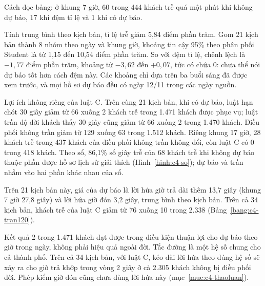 Cách đọc bảng: ở khung 7 giờ, 60 trong 444 khách trễ quá một phút khi không dự báo, 17 khi đệm tỉ lệ và 1 khi có dự
báo.

Tính trung bình theo kịch bản, tỉ lệ trễ giảm 5,84 điểm phần trăm. Gom 21 kịch bản thành 8 nhóm theo ngày và khung giờ,
khoảng tin cậy 95\% theo phân phối Student là từ 1,15 đến 10,54 điểm phần trăm. So với đệm tỉ lệ, chênh lệch là
$-1{,}77$ điểm phần trăm, khoảng từ $-3{,}62$ đến $+0{,}07$, tức có chứa 0: chưa thể nói dự báo tốt hơn cách đệm này.
Các khoảng chỉ dựa trên ba buổi sáng đã được xem trước, và mọi hồ sơ dự báo đều có ngày 12/11 trong các ngày nguồn.

Lợi ích không riêng của luật C. Trên cùng 21 kịch bản, khi có dự báo, luật hạn chót 30 giây giảm từ 66 xuống 2 khách
trễ trong 1.471 khách được phục vụ; luật trần độ dời khách thấy 30 giây cũng giảm từ 66 xuống 2 trong 1.470 khách.
Điều phối không trần giảm từ 129 xuống 63 trong 1.512 khách. Riêng khung 17 giờ, 28 khách trễ trong 437 khách của điều
phối không trần không đổi, còn luật C có 0 trong 418 khách. Theo sổ, 86,1\% số giây trễ của 68 khách trễ khi không dự
báo thuộc phần được hồ sơ lịch sử giải thích (Hình~\ref{hinh:c4-so}); dự báo và trần nhắm vào hai phần khác nhau của sổ.

Trên 21 kịch bản này, giá của dự báo là lời hứa giờ trả dài thêm 13,7 giây (khung 7 giờ 27,8 giây) và lời hứa giờ đón 3,2 giây, trung bình
theo kịch bản. Trên cả 34 kịch bản, khách trễ của luật C giảm từ 76 xuống 10 trong 2.338 (Bảng~\ref{bang:c4-tran120}).

Kết quả 2 trong 1.471 khách đạt được trong điều kiện thuận lợi cho dự báo theo giờ trong ngày, không phải hiệu quả ngoài
đời. Tắc đường là một hệ số chung cho cả thành phố. Trên cả 34 kịch bản, với luật C, kéo dài lời hứa theo đúng hệ số
sẽ xảy ra cho giờ trả khớp trong vòng 2 giây ở cả 2.305 khách không bị điều phối dời. Phép kiểm giờ đón cũng chưa dùng
lời hứa này (mục~\ref{muc:c4-thaoluan}).

